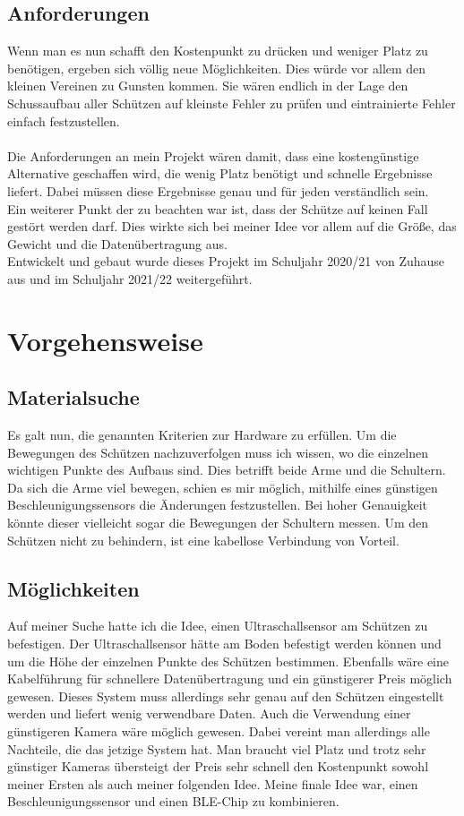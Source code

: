 \subsection{Anforderungen}
Wenn man es nun schafft den Kostenpunkt zu drücken und weniger Platz zu benötigen,
ergeben sich völlig neue Möglichkeiten. Dies würde vor allem den kleinen Vereinen zu Gunsten 
kommen. Sie wären endlich in der Lage den Schussaufbau aller Schützen auf kleinste Fehler 
zu prüfen und eintrainierte Fehler einfach festzustellen.\\
\\
Die Anforderungen an mein Projekt wären damit, dass eine kostengünstige Alternative 
geschaffen wird, die wenig Platz benötigt und schnelle Ergebnisse liefert. Dabei müssen diese 
Ergebnisse genau und für jeden verständlich sein.\\
Ein weiterer Punkt der zu beachten war ist, dass der Schütze auf keinen Fall gestört werden 
darf. Dies wirkte sich bei meiner Idee vor allem auf die Größe, das Gewicht und die 
Datenübertragung aus.\\
Entwickelt und gebaut wurde dieses Projekt im Schuljahr 2020/21 von Zuhause aus und im Schuljahr
2021/22 weitergeführt.

\section{Vorgehensweise}
\subsection{Materialsuche}
Es galt nun, die genannten Kriterien zur Hardware zu erfüllen. Um die Bewegungen des 
Schützen nachzuverfolgen muss ich wissen, wo die einzelnen wichtigen Punkte des Aufbaus 
sind. Dies betrifft beide Arme und die Schultern. Da sich die Arme viel bewegen, schien es mir 
möglich, mithilfe eines günstigen Beschleunigungssensors die Änderungen festzustellen. Bei 
hoher Genauigkeit könnte dieser vielleicht sogar die Bewegungen der Schultern messen.
Um den Schützen nicht zu behindern, ist eine kabellose Verbindung von Vorteil.

\subsection{Möglichkeiten}
Auf meiner Suche hatte ich die Idee, einen Ultraschallsensor am Schützen zu befestigen. Der 
Ultraschallsensor hätte am Boden befestigt werden können und um die Höhe der einzelnen 
Punkte des Schützen bestimmen. Ebenfalls wäre eine Kabelführung für schnellere 
Datenübertragung und ein günstigerer Preis möglich gewesen. Dieses System muss allerdings 
sehr genau auf den Schützen eingestellt werden und liefert wenig verwendbare Daten.
Auch die Verwendung einer günstigeren Kamera wäre möglich gewesen. Dabei vereint man 
allerdings alle Nachteile, die das jetzige System hat. Man braucht viel Platz und trotz sehr 
günstiger Kameras übersteigt der Preis sehr schnell den Kostenpunkt sowohl meiner Ersten 
als auch meiner folgenden Idee.
Meine finale Idee war, einen Beschleunigungssensor und einen BLE-Chip zu kombinieren.
